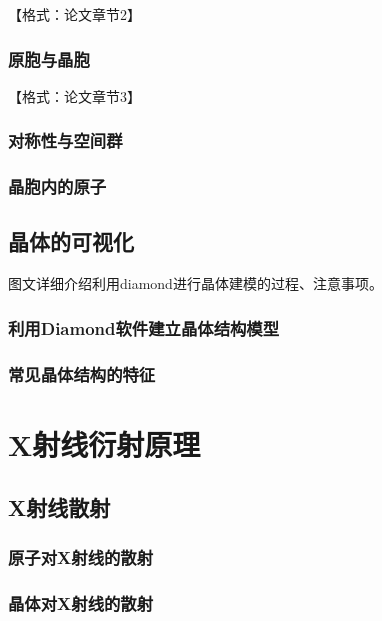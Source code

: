 \documentclass[12pt,a4paper]{ctexart}
\newcommand{\smtext}[1]{{\fontsize{9.3pt}{12pt}\selectfont #1}}
\begin{document}
\smtext{【格式：论文章节2】}

\subsubsection{原胞与晶胞}

\smtext{【格式：论文章节3】}

\subsubsection{对称性与空间群}

\subsubsection{晶胞内的原子}

\subsection{晶体的可视化}

\smtext{图文详细介绍利用diamond进行晶体建模的过程、注意事项。}

\subsubsection{利用Diamond软件建立晶体结构模型}

\subsubsection{常见晶体结构的特征}

\section{X射线衍射原理}

\subsection{X射线散射}

\subsubsection{原子对X射线的散射}

\subsubsection{晶体对X射线的散射}
\end{document}

